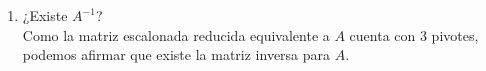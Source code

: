 \begin{enumerate}[label=\listAlph]
\[\begin{aligned}
                        36 + 24
                    \right)
                    -
                    \left(
                        \frac{54}{5} + 56
                    \right)
                    =
                    \frac{300}{5}
                    - 
                    \frac{334}{5}
                    \\
                    &=
                    -\frac{34}{5}
                \end{aligned}
            \]
        \item ¿Existe \(A^{-1}\)? \\
            Como la matriz escalonada reducida equivalente a \(A\) cuenta con 3 pivotes, podemos afirmar que existe la matriz inversa para \(A\).

\end{enumerate}
